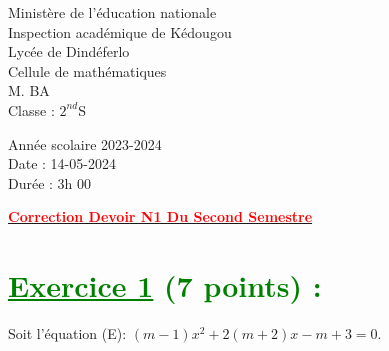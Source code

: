 \documentclass[12pt]{article}
\begin{document}
\begin{minipage}{0.5\textwidth}
	Ministère de l'éducation nationale  \\
	Inspection académique de Kédougou   \\
	Lycée de Dindéferlo            \\
	Cellule de mathématiques            \\
	M. BA                          \\
	Classe : $2^{nd}$S  \\
\end{minipage}
\begin{minipage}{0.5\textwidth}
	Année scolaire 2023-2024 \\
	Date : 14-05-2024 \\
	Durée : 3h 00 \\
\end{minipage}

\begin{center}
	\textbf{{\underline{\textcolor{red}{Correction Devoir N1 Du Second Semestre}}}}
\end{center}
\section*{\textcolor{green}{\underline{Exercice 1} (7 points) :}}
Soit l’équation (E): \((m -1)x^2 + 2(m + 2)x - m + 3 = 0\).
\end{document}
